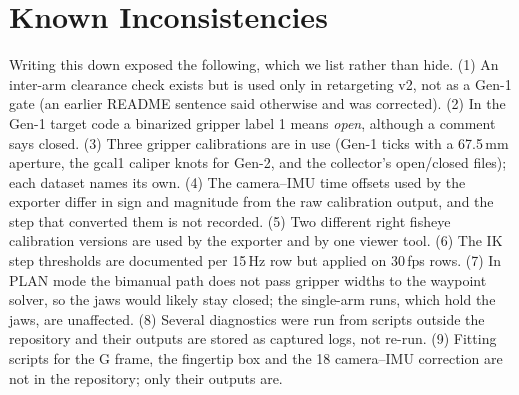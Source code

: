 \documentclass[conference,10pt]{IEEEtran}
\newcommand{\mm}{\,mm\xspace}
\begin{document}
\section{Known Inconsistencies}\label{sec:issues}
Writing this down exposed the following, which we list rather than hide. (1) An inter-arm clearance check exists but is used only in
retargeting v2, not as a Gen-1 gate (an earlier README sentence said otherwise and was corrected). (2) In the Gen-1 target code a
binarized gripper label 1 means \emph{open}, although a comment says closed. (3) Three gripper calibrations are in use (Gen-1 ticks with
a 67.5\mm{} aperture, the gcal1 caliper knots for Gen-2, and the collector's open/closed files); each dataset names its own. (4) The
camera--IMU time offsets used by the exporter differ in sign and magnitude from the raw calibration output, and the step that converted
them is not recorded. (5) Two different right fisheye calibration versions are used by the exporter and by one viewer tool. (6) The IK
step thresholds are documented per 15\,Hz row but applied on 30\,fps rows. (7) In PLAN mode the bimanual path does not pass gripper
widths to the waypoint solver, so the jaws would likely stay closed; the single-arm runs, which hold the jaws, are unaffected.
(8) Several diagnostics were run from scripts outside the repository and their outputs are stored as captured logs, not re-run.
(9) Fitting scripts for the G frame, the fingertip box and the 18\textdegree{} camera--IMU correction are not in the repository; only
their outputs are.
\end{document}
